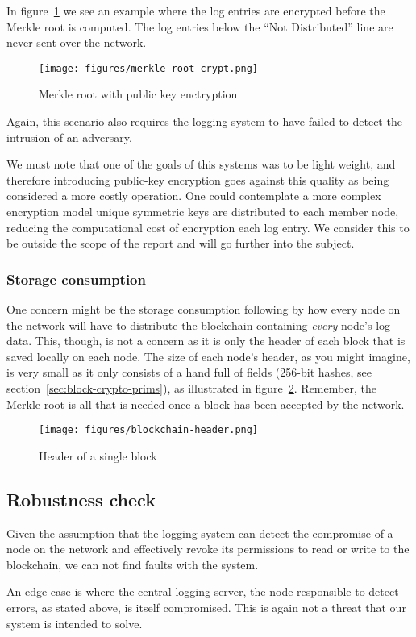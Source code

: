 In figure~\ref{fig:merkle-root-crypt} we see an example where the log
entries are encrypted before the Merkle root is computed. The log
entries below the ``Not Distributed'' line are never sent over the
network.

\begin{figure}
  \centering
  \texttt{[image: figures/merkle-root-crypt.png]}
  \caption{\label{fig:merkle-root-crypt} Merkle root with public key enctryption}
\end{figure}

Again, this scenario also requires the logging system to have failed
to detect the intrusion of an adversary.

We must note that one of the goals of this systems was to be light
weight, and therefore introducing public-key encryption goes against
this quality as being considered a more costly operation. One could
contemplate a more complex encryption model unique symmetric keys are
distributed to each member node, reducing the computational cost of
encryption each log entry. We consider this to be outside the scope of
the report and will go further into the subject.

\subsubsection{Storage consumption}
One concern might be the storage consumption following by how every
node on the network will have to distribute the blockchain containing
\textit{every} node's log-data. This, though, is not a concern as it
is only the header of each block that is saved locally on each
node. The size of each node's header, as you might imagine, is very
small as it only consists of a hand full of fields (256-bit hashes,
see section~\ref{sec:block-crypto-prims}), as illustrated in
figure~\ref{fig:blockchain-header}. Remember, the Merkle root is all
that is needed once a block has been accepted by the network.

\begin{figure}[H]
  \centering
  \texttt{[image: figures/blockchain-header.png]}
  \caption{\label{fig:blockchain-header} Header of a single block}
\end{figure}


\subsection{Robustness check}
Given the assumption that the logging system can detect the compromise
of a node on the network and effectively revoke its permissions to
read or write to the blockchain, we can not find faults with the
system.

An edge case is where the central logging server, the node responsible
to detect errors, as stated above, is itself compromised. This is
again not a threat that our system is intended to solve.

